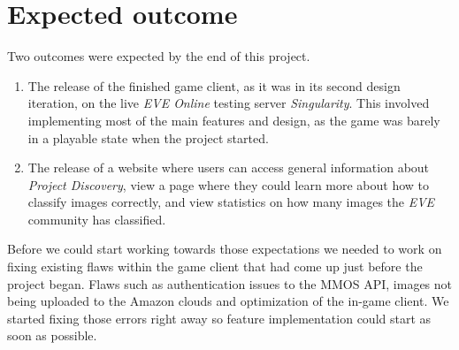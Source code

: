 \section{Expected outcome}\label{sec:expected_outcome}

Two outcomes were expected by the end of this project.

\begin{enumerate}
	\item{The release of the finished game client, as it was in its second design iteration, on the live \emph{EVE Online} testing server \emph{Singularity}. This involved implementing most of the main features and design, as the game was barely in a playable state when the project started.}
	\item{The release of a website where users can access general information about \emph{Project Discovery}, view a page where they could learn more about how to classify images correctly, and view statistics on how many images the \emph{EVE} community has classified. }
\end{enumerate}

Before we could start working towards those expectations we needed to work on fixing existing flaws within the game client that had come up just before the project began. Flaws such as authentication issues to the MMOS API, images not being uploaded to the Amazon clouds and optimization of the in-game client. We started fixing those errors right away so feature implementation could start as soon as possible.

